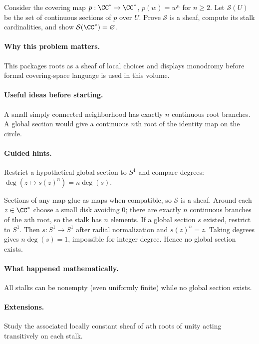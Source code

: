 \begin{problem}
Consider the covering map $p:\CC^*\to\CC^*$, $p(w)=w^n$ for $n\ge2$. Let $\mathcal S(U)$ be the set of continuous sections of $p$ over $U$. Prove $\mathcal S$ is a sheaf, compute its stalk cardinalities, and show $\mathcal S(\CC^*)=\varnothing$.
\end{problem}

\paragraph{Why this problem matters.}
This packages roots as a sheaf of local choices and displays monodromy before formal covering-space language is used in this volume.

\paragraph{Useful ideas before starting.}
A small simply connected neighborhood has exactly $n$ continuous root branches. A global section would give a continuous $n$th root of the identity map on the circle.

\paragraph{Guided hints.}
Restrict a hypothetical global section to $S^1$ and compare degrees: $\deg(z\mapsto s(z)^n)=n\deg(s)$.

\ifdefined\FullProblemDossiers
\begin{solution}
Sections of any map glue as maps when compatible, so $\mathcal S$ is a sheaf. Around each $z\in\CC^*$ choose a small disk avoiding $0$; there are exactly $n$ continuous branches of the $n$th root, so the stalk has $n$ elements. If a global section $s$ existed, restrict to $S^1$. Then $s:S^1\to S^1$ after radial normalization and $s(z)^n=z$. Taking degrees gives $n\deg(s)=1$, impossible for integer degree. Hence no global section exists.
\end{solution}

\paragraph{What happened mathematically.}
All stalks can be nonempty (even uniformly finite) while no global section exists.

\paragraph{Extensions.}
Study the associated locally constant sheaf of $n$th roots of unity acting transitively on each stalk.
\fi
